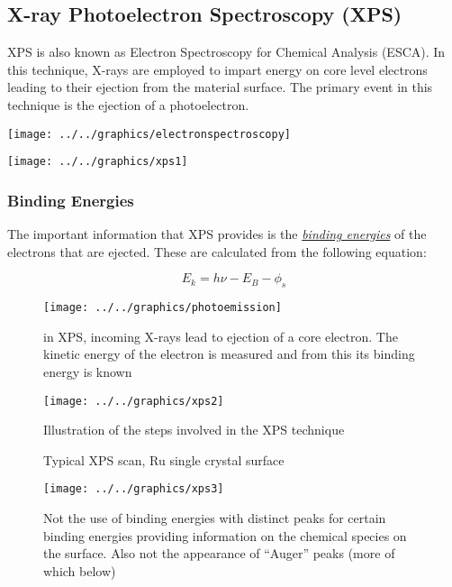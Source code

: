 \documentclass[ignorenonframetext]{beamer}
\begin{document}
\subsection{X-ray Photoelectron Spectroscopy (XPS)}

XPS is also known as Electron Spectroscopy for Chemical Analysis (ESCA). In this technique, X-rays are employed to impart energy on core level electrons leading to their ejection from the material surface. The primary event in this technique is the ejection of a photoelectron.

\begin{center}\texttt{[image: ../../graphics/electronspectroscopy]}\end{center}

\texttt{[image: ../../graphics/xps1]}

\subsubsection{Binding Energies}

The important information that XPS provides is the \textit{\underline{binding energies}} of the electrons that are ejected. These are calculated from the following equation:

\begin{equation}
E_k = h\nu - E_B - \phi_s
\end{equation}

\begin{figure}
\centering
\texttt{[image: ../../graphics/photoemission]}
\caption{in XPS, incoming X-rays lead to ejection of a core electron. The kinetic energy of the electron is measured and from this its binding energy is known}
\end{figure}

\begin{figure}
\centering
\texttt{[image: ../../graphics/xps2]}
\caption{Illustration of the steps involved in the XPS technique}
\end{figure}

\begin{figure}
\centering
Typical XPS scan, Ru single crystal surface

\texttt{[image: ../../graphics/xps3]}
\caption{Not the use of binding energies with distinct peaks for certain binding energies providing information on the chemical species on the surface. Also not the appearance of ``Auger'' peaks (more of which below)}
\end{figure}
\end{document}
